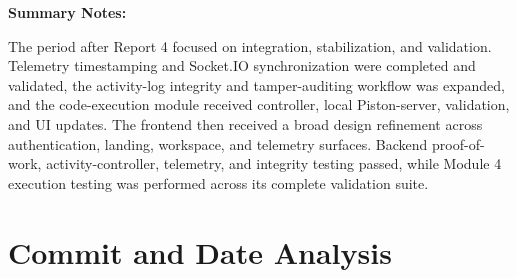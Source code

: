 \documentclass[11pt,a4paper]{article}
\begin{document}
\textbf{Summary Notes:}

The period after Report 4 focused on integration, stabilization, and validation. Telemetry timestamping and Socket.IO synchronization were completed and validated, the activity-log integrity and tamper-auditing workflow was expanded, and the code-execution module received controller, local Piston-server, validation, and UI updates. The frontend then received a broad design refinement across authentication, landing, workspace, and telemetry surfaces. Backend proof-of-work, activity-controller, telemetry, and integrity testing passed, while Module 4 execution testing was performed across its complete validation suite.

\section{Commit and Date Analysis}
\end{document}

